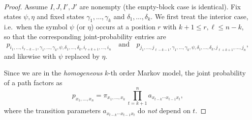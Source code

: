\documentclass[11pt, a4paper]{article}
\numberwithin{equation}{section}
\theoremstyle{plain}
\theoremstyle{definition}
\renewcommand{\emph}[1]{\textit{#1}}
\begin{document}
\begin{proof}
Assume $I,J,I',J'$ are nonempty (the empty-block case is identical). Fix states
$\psi,\eta$ and fixed states $\gamma_1,\dots,\gamma_k$ and $\delta_1,\dots,\delta_k$.
We first treat the interior case, i.e.\ when the symbol $\psi$ (or $\eta$) occurs at a position
$r$ with $k+1\le r,\ell\le n-k$, so that the
corresponding joint-probability entries are
\[
p_{i_1,\dots,i_{r-k-1},\gamma_1,\dots,\gamma_k,\psi,\delta_1,\dots,\delta_k,i_{r+k+1},\dots,i_n}
\quad\text{and}\quad
p_{j_1,\dots,j_{\ell-k-1},\gamma_1,\dots,\gamma_k,\psi,\delta_1,\dots,\delta_k,j_{\ell+k+1},\dots,j_n},
\]
and likewise with $\psi$ replaced by $\eta$.


\medskip

Since we are in the \emph{homogeneous} $k$-th order Markov model, the joint probability of a path
factors as
\[
p_{x_1,\dots,x_n}
=\pi_{x_1,\dots,x_k}\,\prod_{t=k+1}^{n} a_{x_{t-k}\cdots x_{t-1}x_t},
\]
where the transition parameters $a_{x_{t-k}\cdots x_{t-1}x_t}$ do \emph{not} depend on $t$.


\end{proof}
\end{document}
